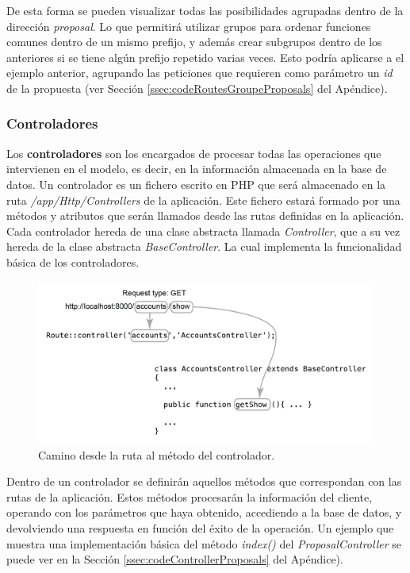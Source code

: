 De esta forma se pueden visualizar todas las posibilidades agrupadas dentro de la dirección \textit{proposal}. Lo que permitirá utilizar grupos para ordenar funciones comunes dentro de un mismo prefijo, y además crear subgrupos dentro de los anteriores si se tiene algún prefijo repetido varias veces. Esto podría aplicarse a el ejemplo anterior, agrupando las peticiones que requieren como parámetro un \textit{id} de la propuesta (ver Sección \ref{ssec:codeRoutesGroupeProposals} del Apéndice).

\subsubsection{Controladores}

Los \textbf{controladores} son los encargados de procesar todas las operaciones que intervienen en el modelo, es decir, en la información almacenada en la base de datos. Un controlador es un fichero escrito en PHP que será almacenado en la ruta \textit{/app/Http/Controllers} de la aplicación. Este fichero estará formado por una métodos y atributos que serán llamados desde las rutas definidas en la aplicación. Cada controlador hereda de una clase abstracta llamada \textit{Controller}, que a su vez hereda de la clase abstracta \textit{BaseController}. La cual implementa la funcionalidad básica de los controladores.

\begin{figure}[!]
\centering
\includegraphics[keepaspectratio, scale=1]{Media/Captures/getDiagramMethod.png}
\caption{Camino desde la ruta al método del controlador.}
\label{fig:laravelArch}
\end{figure}

Dentro de un controlador se definirán aquellos métodos que correspondan con las rutas de la aplicación. Estos métodos procesarán la información del cliente, operando con los parámetros que haya obtenido, accediendo a la base de datos, y devolviendo una respuesta en función del éxito de la operación. Un ejemplo que muestra una implementación básica del método \textit{index()} del \textit{ProposalController} se puede ver en la Sección \ref{ssec:codeControllerProposals} del Apéndice).

